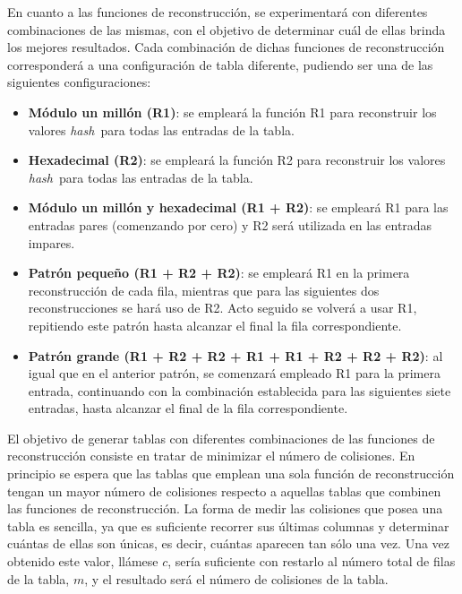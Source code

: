 \documentclass[12pt,spanish,listoffigures,listoftables]{tfgetsinf}
\newcommand{\hash}{\textit{hash}}
\begin{document}
En cuanto a las funciones de reconstrucción, se experimentará con diferentes combinaciones de las mismas, con el objetivo de determinar cuál de ellas brinda los mejores resultados. Cada combinación de dichas funciones de reconstrucción corresponderá a una configuración de tabla diferente, pudiendo ser una de las siguientes configuraciones:

\begin{itemize}

    \item \textbf{Módulo un millón (R1)}: se empleará la función R1 para reconstruir los valores \hash~para todas las entradas de la tabla.
    
    \item \textbf{Hexadecimal (R2)}: se empleará la función R2 para reconstruir los valores \hash~para todas las entradas de la tabla.
    
    \item \textbf{Módulo un millón y hexadecimal (R1 + R2)}: se empleará R1 para las entradas pares (comenzando por cero) y R2 será utilizada en las entradas impares.
    
    \item \textbf{Patrón pequeño (R1 + R2 + R2)}: se empleará R1 en la primera reconstrucción de cada fila, mientras que para las siguientes dos reconstrucciones se hará uso de R2. Acto seguido se volverá a usar R1, repitiendo este patrón hasta alcanzar el final la fila correspondiente.
    
    \item \textbf{Patrón grande (R1 + R2 + R2 + R1 + R1 + R2 + R2 + R2)}: al igual que en el anterior patrón, se comenzará empleado R1 para la primera entrada, continuando con la combinación establecida para las siguientes siete entradas, hasta alcanzar el final de la fila correspondiente.
    
\end{itemize}

El objetivo de generar tablas con diferentes combinaciones de las funciones de reconstrucción consiste en tratar de minimizar el número de colisiones. En principio se espera que las tablas que emplean una sola función de reconstrucción tengan un mayor número de colisiones respecto a aquellas tablas que combinen las funciones de reconstrucción. La forma de medir las colisiones que posea una tabla es sencilla, ya que es suficiente recorrer sus últimas columnas y determinar cuántas de ellas son únicas, es decir, cuántas aparecen tan sólo una vez. Una vez obtenido este valor, llámese $c$, sería suficiente con restarlo al número total de filas de la tabla, $m$, y el resultado será el número de colisiones de la tabla.
\end{document}
